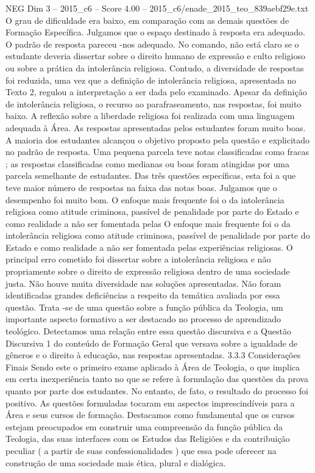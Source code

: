 \begin{textsample}{NEG Dim 3 – 2015\_c6 – Score 4.00 – 2015\_c6/enade\_2015\_teo\_839aebf29e.txt}
O grau de dificuldade era baixo, em comparação com as demais questões de Formação Específica.
Julgamos que o espaço destinado à resposta era adequado.
O padrão de resposta pareceu -nos adequado.
No comando, não está claro se o estudante deveria dissertar sobre o direito humano de expressão e culto religioso ou sobre a prática da intolerância religiosa.
Contudo, a diversidade de respostas foi reduzida, uma vez que a definição de intolerância religiosa, apresentada no Texto 2, regulou a interpretação a ser dada pelo examinado.
Apesar da definição de intolerância religiosa, o recurso ao parafraseamento, nas respostas, foi muito baixo.
A reflexão sobre a liberdade religiosa foi realizada com uma linguagem adequada à Área.
As respostas apresentadas pelos estudantes foram muito boas.
A maioria dos estudantes alcançou o objetivo proposto pela questão e explicitado no padrão de resposta.
Uma pequena parcela teve notas classificadas como fracas ; as respostas classificadas como medianas ou boas foram atingidas por uma parcela semelhante de estudantes.
Das três questões específicas, esta foi a que teve maior número de respostas na faixa das notas boas.
Julgamos que o desempenho foi muito bom.
O enfoque mais frequente foi o da intolerância religiosa como atitude criminosa, passível de penalidade por parte do Estado e como realidade a não ser fomentada pelas O enfoque mais frequente foi o da intolerância religiosa como atitude criminosa, passível de penalidade por parte do Estado e como realidade a não ser fomentada pelas experiências religiosas.
O principal erro cometido foi dissertar sobre a intolerância religiosa e não propriamente sobre o direito de expressão religiosa dentro de uma sociedade justa.
Não houve muita diversidade nas soluções apresentadas.
Não foram identificadas grandes deficiências a respeito da temática avaliada por essa questão.
Trata -se de uma questão sobre a função pública da Teologia, um importante aspecto formativo a ser destacado no processo de aprendizado teológico.
Detectamos uma relação entre essa questão discursiva e a Questão Discursiva 1 do conteúdo de Formação Geral que versava sobre a igualdade de gêneros e o direito à educação, nas respostas apresentadas. 3.3.3 Considerações Finais Sendo este o primeiro exame aplicado à Área de Teologia, o que implica em certa inexperiência tanto no que se refere à formulação das questões da prova quanto por parte dos estudantes.
No entanto, de fato, o resultado do processo foi positivo.
As questões formuladas tocaram em aspectos imprescindíveis para a Área e seus cursos de formação.
Destacamos como fundamental que os cursos estejam preocupados em construir uma compreensão da função pública da Teologia, das suas interfaces com os Estudos das Religiões e da contribuição peculiar ( a partir de suas confessionalidades ) que essa pode oferecer na construção de uma sociedade mais ética, plural e dialógica.

\end{textsample}
